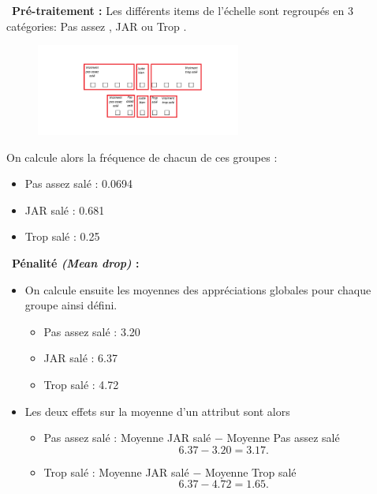 \documentclass[aspectratio=169,xcolor=dvipsnames]{beamer}
\begin{document}
\begin{frame}
\textcolor{nyubluedarker}{\faCogs \ \textbf{Pré-traitement :}} Les différents items de l'échelle sont regroupés en 3 catégories: \og Pas assez \fg{}, \og JAR \fg{} ou \og Trop \fg{}.
		\begin{figure}
		\centering
		\includegraphics[width=0.6\textwidth]{group_echelles.png}
		\end{figure}
	On calcule alors la fréquence de chacun de ces groupes :
		\begin{itemize}
		\item \og Pas assez \fg{}  salé : 0.0694
		\item \og JAR \fg{}  salé : 0.681
		\item \og Trop \fg{} salé : 0.25
		\end{itemize}	

\end{frame}

\begin{frame}

\textcolor{nyubluedarker}{\faCogs \ \textbf{Pénalité \emph{(Mean drop)} :}}

	\begin{itemize}
	\item On calcule ensuite les moyennes des appréciations globales pour chaque groupe ainsi défini.
		\begin{itemize}
		\item \og Pas assez \fg{}  salé : 3.20
		\item \og JAR \fg{}  salé : 6.37
		\item \og Trop \fg{} salé : 4.72
		\end{itemize}
	\item Les deux effets sur la moyenne d'un attribut sont alors
		\begin{itemize}
		\item \og Pas assez \fg{} salé : Moyenne \og JAR \fg{} salé $-$ Moyenne \og Pas assez \fg{} salé
			\[6.37-3.20 = 3.17.\]
		\item \og Trop \fg{} salé : Moyenne \og JAR \fg{} salé $-$ Moyenne \og Trop \fg{} salé
			\[6.37-4.72 = 1.65.\]
		\end{itemize}
	\end{itemize}
		
\end{frame}
\end{document}
